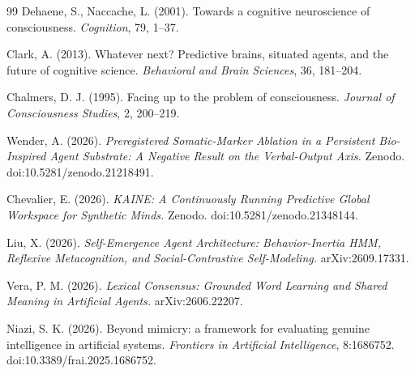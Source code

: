 \documentclass[11pt]{article}
\begin{document}
\begin{thebibliography}{99}
Dehaene, S., Naccache, L. (2001).
Towards a cognitive neuroscience of consciousness.
\emph{Cognition}, 79, 1--37.

Clark, A. (2013).
Whatever next? Predictive brains, situated agents, and the future of cognitive science.
\emph{Behavioral and Brain Sciences}, 36, 181--204.

Chalmers, D. J. (1995).
Facing up to the problem of consciousness.
\emph{Journal of Consciousness Studies}, 2, 200--219.

Wender, A. (2026).
\emph{Preregistered Somatic-Marker Ablation in a Persistent Bio-Inspired Agent Substrate: A Negative Result on the Verbal-Output Axis.}
Zenodo. doi:10.5281/zenodo.21218491.

Chevalier, E. (2026).
\emph{KAINE: A Continuously Running Predictive Global Workspace for Synthetic Minds.}
Zenodo. doi:10.5281/zenodo.21348144.

Liu, X. (2026).
\emph{Self-Emergence Agent Architecture: Behavior-Inertia HMM, Reflexive Metacognition, and Social-Contrastive Self-Modeling.}
arXiv:2609.17331.

Vera, P. M. (2026).
\emph{Lexical Consensus: Grounded Word Learning and Shared Meaning in Artificial Agents.}
arXiv:2606.22207.

Niazi, S. K. (2026).
Beyond mimicry: a framework for evaluating genuine intelligence in artificial systems.
\emph{Frontiers in Artificial Intelligence}, 8:1686752. doi:10.3389/frai.2025.1686752.

\end{thebibliography}
\end{document}
